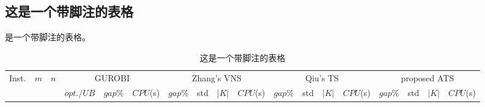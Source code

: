 \subsection{这是一个带脚注的表格}
 是一个带脚注的表格。
\begin{table*}[!h]
	\scriptsize
	\centerfloat
	\caption{这是一个带脚注的表格}\label{tbl:notetable}
	\begin{threeparttable}
		\begin{tabular}{lcrrrrrrrrrrrrrrrr}
			\toprule
			\multirow{2}{*}{Inst.}&\multirow{2}{*}{$m$}&\multirow{2}{*}{$n$}&\multicolumn{3}{c}{GUROBI}&\multicolumn{4}{c}{Zhang's VNS}&\multicolumn{4}{c}{Qiu's TS}&\multicolumn{4}{c}{proposed ATS}\\
			\cmidrule(r){4-6}\cmidrule(r){7-10}\cmidrule(r){11-14}\cmidrule(r){15-18}
			&&&$opt./UB$&$gap\%$&$CPU$(s)&$gap\%$&std&$|K|$&$CPU$(s)&$gap\%$&std&$|K|$&$CPU$(s)&$gap\%$&std&$|K|$&$CPU$(s)\\
			

\end{tabular}
\end{threeparttable}
\end{table*}
